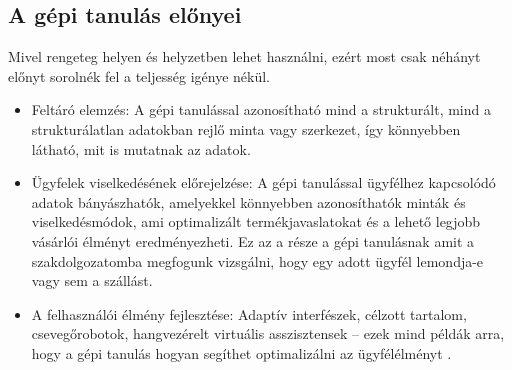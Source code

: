 \subsection{A gépi tanulás előnyei}
Mivel rengeteg helyen és helyzetben lehet használni, ezért most csak néhányt előnyt sorolnék fel a teljesség igénye nékül.
\begin{itemize}
    \item Feltáró elemzés: A gépi tanulással azonosítható mind a strukturált, mind a strukturálatlan adatokban rejlő minta vagy szerkezet, így könnyebben látható, mit is mutatnak az adatok.
    \item Ügyfelek viselkedésének előrejelzése: A gépi tanulással ügyfélhez kapcsolódó adatok bányászhatók, amelyekkel könnyebben azonosíthatók minták és viselkedésmódok, ami optimalizált termékjavaslatokat és a lehető legjobb vásárlói élményt eredményezheti. Ez az a része a gépi tanulásnak amit a szakdolgozatomba megfogunk vizsgálni, hogy egy adott ügyfél lemondja-e vagy sem a szállást.
    \item A felhasználói élmény fejlesztése: Adaptív interfészek, célzott tartalom, csevegőrobotok, hangvezérelt virtuális asszisztensek – ezek mind példák arra, hogy a gépi tanulás hogyan segíthet optimalizálni az ügyfélélményt \cite{machinelearningbasics}.
\end{itemize}

